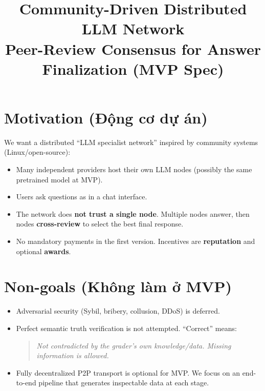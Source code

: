 \documentclass[11pt]{article}
\title{Community-Driven Distributed LLM Network\\
Peer-Review Consensus for Answer Finalization (MVP Spec)}
\author{}
\date{}
\begin{document}
\maketitle

\section{Motivation (Động cơ dự án)}
We want a distributed ``LLM specialist network'' inspired by community systems (Linux/open-source):
\begin{itemize}[leftmargin=1.2em]
  \item Many independent providers host their own LLM nodes (possibly the same pretrained model at MVP).
  \item Users ask questions as in a chat interface.
  \item The network does \textbf{not trust a single node}. Multiple nodes answer, then nodes \textbf{cross-review} to select the best final response.
  \item No mandatory payments in the first version. Incentives are \textbf{reputation} and optional \textbf{awards}.
\end{itemize}

\section{Non-goals (Không làm ở MVP)}
\begin{itemize}[leftmargin=1.2em]
  \item Adversarial security (Sybil, bribery, collusion, DDoS) is deferred.
  \item Perfect semantic truth verification is not attempted. ``Correct'' means:
  \begin{quote}
    \textit{Not contradicted by the grader's own knowledge/data. Missing information is allowed.}
  \end{quote}
  \item Fully decentralized P2P transport is optional for MVP. We focus on an end-to-end pipeline that generates inspectable data at each stage.
\end{itemize}
\end{document}
